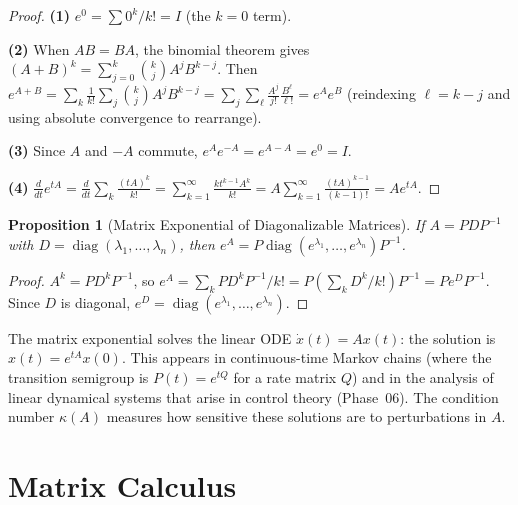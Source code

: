 \documentclass[11pt,a4paper]{article}
\theoremstyle{definition}
\theoremstyle{plain}
\newtheorem{proposition}[theorem]{Proposition}
\theoremstyle{remark}
\DeclareMathOperator{\diag}{diag}
\begin{document}
\begin{proof}
\textbf{(1)} $e^0 = \sum 0^k/k! = I$ (the $k=0$ term).

\textbf{(2)} When $AB = BA$, the binomial theorem gives
$(A+B)^k = \sum_{j=0}^k \binom{k}{j} A^j B^{k-j}$. Then
$e^{A+B} = \sum_k \frac{1}{k!} \sum_j \binom{k}{j} A^j B^{k-j}
= \sum_j \sum_\ell \frac{A^j}{j!} \frac{B^\ell}{\ell!} = e^A e^B$
(reindexing $\ell = k - j$ and using absolute convergence to rearrange).

\textbf{(3)} Since $A$ and $-A$ commute, $e^A e^{-A} = e^{A-A} = e^0 = I$.

\textbf{(4)} $\frac{d}{dt} e^{tA} = \frac{d}{dt} \sum_k \frac{(tA)^k}{k!}
= \sum_{k=1}^\infty \frac{k t^{k-1} A^k}{k!} = A \sum_{k=1}^\infty \frac{(tA)^{k-1}}{(k-1)!}
= A e^{tA}$.
\end{proof}

\begin{proposition}[Matrix Exponential of Diagonalizable Matrices]
\label{prop:exp_diag}
If $A = P D P^{-1}$ with $D = \diag(\lambda_1, \ldots, \lambda_n)$, then
$e^A = P \diag(e^{\lambda_1}, \ldots, e^{\lambda_n}) P^{-1}$.
\end{proposition}

\begin{proof}
$A^k = P D^k P^{-1}$, so $e^A = \sum_k P D^k P^{-1} / k! = P (\sum_k D^k / k!) P^{-1}
= P e^D P^{-1}$. Since $D$ is diagonal, $e^D = \diag(e^{\lambda_1}, \ldots, e^{\lambda_n})$.
\end{proof}

\begin{rlconnection}
The matrix exponential solves the linear ODE $\dot{x}(t) = Ax(t)$: the solution is
$x(t) = e^{tA} x(0)$. This appears in continuous-time Markov chains (where the transition
semigroup is $P(t) = e^{tQ}$ for a rate matrix $Q$) and in the analysis of linear dynamical
systems that arise in control theory (Phase~06). The condition number $\kappa(A)$ measures
how sensitive these solutions are to perturbations in $A$.
\end{rlconnection}

\section{Matrix Calculus}
\label{sec:matrix_calculus}
\end{document}
